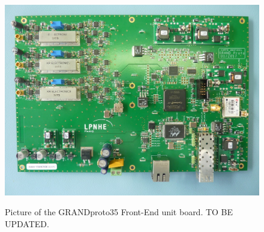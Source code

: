 \begin{figure}[t!]
\begin{center}
{
\includegraphics[width=\textwidth]{plots/board.jpg}  
}
\end{center}
\caption{Picture of the GRANDproto35 Front-End unit board. TO BE UPDATED.
}
\label{fig:board} 
\end{figure}


